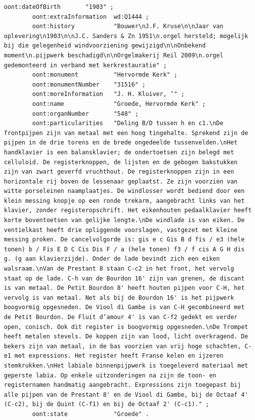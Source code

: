 \begin{lstlisting}[caption={Part14\_000Groede}]
        oont:dateOfBirth       "1903" ;
        oont:extraInformation  wd:Q1444 ;
        oont:history           "Bouwer\nJ.F. Kruse\n\nJaar van oplevering\n1903\n\nJ.C. Sanders & Zn 1951\n.orgel hersteld; mogelijk bij die gelegenheid windvoorziening gewijzigd\n\nOnbekend moment\n.pijpwerk beschadigd\n\nOrgelmakerij Reil 2009\n.orgel gedemonteerd in verband met kerkrestauratie" ;
        oont:monument          "Hervormde Kerk" ;
        oont:monumentNumber    "31516" ;
        oont:moreInformation   "J. H. Kluiver, ‘" ;
        oont:name              "Groede, Hervormde Kerk" ;
        oont:organNumber       "548" ;
        oont:particularities   "Deling B/D tussen h en c1.\nDe frontpijpen zijn van metaal met een hoog tingehalte. Sprekend zijn de pijpen in de drie torens en de brede ongedeelde tussenvelden.\nHet handklavier is een balansklavier; de ondertoetsen zijn belegd met celluloid. De registerknoppen, de lijsten en de gebogen bakstukken zijn van zwart geverfd vruchthout. De registerknoppen zijn in een horizontale rij boven de lessenaar geplaatst. Ze zijn voorzien van witte porseleinen naamplaatjes. De windlosser wordt bediend door een klein messing knopje op een ronde trekarm, aangebracht links van het klavier, zonder registeropschrift. Het eikenhouten pedaalklavier heeft korte boventoetsen van gelijke lengte.\nDe windlade is van eiken. De ventielkast heeft drie opliggende voorslagen, vastgezet met kleine messing proken. De cancelvolgorde is: gis e c Gis B d fis / e3 (hele tonen) b / Fis E D C Cis Dis F / a (hele tonen) f3 / f cis A G H dis g. (g aan klavierzijde). Onder de lade bevindt zich een eiken walsraam.\nVan de Prestant 8 staan C-c2 in het front, het vervolg staat op de lade. C-h van de Bourdon 16' zijn van grenen, de discant is van metaal. De Petit Bourdon 8' heeft houten pijpen voor C-H, het vervolg is van metaal. Net als bij de Bourdon 16' is het pijpwerk boogvormig opgesneden. De Viool di Gambe is van C-H gecombineerd met de Petit Bourdon. De Fluit d’amour 4' is van C-f2 gedekt en verder open, conisch. Ook dit register is boogvormig opgesneden.\nDe Trompet heeft metalen stevels. De koppen zijn van lood, licht overkragend. De bekers zijn van metaal, in de bas voorzien van vrij hoge schachten, C-e1 met expressions. Het register heeft Franse kelen en ijzeren stemkrukken.\nHet labiale binnenpijpwerk is toegeleverd materiaal met geperste labia. Op enkele uitzonderingen na zijn de toon- en registernamen handmatig aangebracht. Expressions zijn toegepast bij alle pijpen van de Prestant 8' en de Viool di Gambe, bij de Octaaf 4' (C-c2), bij de Quint (C-f1) en bij de Octaaf 2' (C-c1)." ;
        oont:state             "Groede" .


\end{lstlisting}
